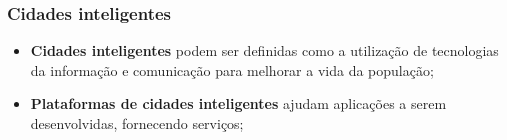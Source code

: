 \begin{frame}
    \frametitle{Cidades inteligentes}

    \begin{itemize}
        \item \textbf{Cidades inteligentes} podem ser definidas como a
            utilização de tecnologias da informação e comunicação para
            melhorar a vida da população;

        \item \textbf{Plataformas de cidades inteligentes} ajudam aplicações
            a serem desenvolvidas, fornecendo serviços;
    \end{itemize}
\end{frame}
